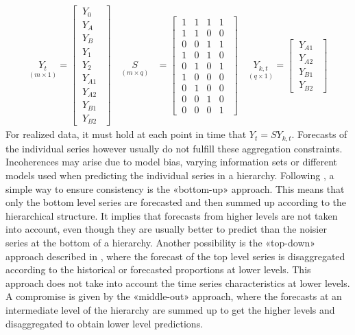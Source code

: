 \documentclass[a4paper,fleqn,11pt]{article}
\begin{document}
\begin{align*}
\underset{(m\times 1)}{Y_t} = \begin{bmatrix}
\ Y_0\ \ \\
\ Y_A\ \ \\
\ Y_B\ \ \\
\ Y_1\ \ \\
\ Y_2\ \ \\
\ Y_{A1}\ \ \\
\ Y_{A2}\ \ \\
\ Y_{B1}\ \ \\
\ Y_{B2}\ \ 
\end{bmatrix} \quad \underset{(m\times q)}{S} &=
\begin{bmatrix}
\ 1 & 1 & 1 & 1 \ \ \\
\ 1 & 1 & 0 & 0 \ \ \\
\ 0 & 0  & 1 & 1\ \ \\
\ 1 & 0 & 1 & 0 \ \ \\
\ 0 & 1 & 0 & 1\ \ \\
\ 1 & 0 & 0 & 0 \ \ \\
\ 0 & 1 & 0 & 0 \ \ \\
\ 0 & 0 & 1 & 0 \ \ \\
\ 0 & 0 & 0 & 1\ \ 
\end{bmatrix} \quad \underset{(q\times 1)}{Y_{k,t}} = \begin{bmatrix}
	\ Y_{A1}\ \ \\
	\ Y_{A2}\ \ \\
	\ Y_{B1}\ \ \\
	\ Y_{B2}\ \ 
\end{bmatrix} 
\end{align*}
For realized data, it must hold at each point in time that $Y_t = S Y_{k,t}$. Forecasts of the individual series however usually do not fulfill these aggregation constraints. Incoherences may arise due to model bias, varying information sets or different models used when predicting the individual series in a hierarchy. Following \cite{Gross1990}, a simple way to ensure consistency is the «bottom-up» approach. This means that only the bottom level series are forecasted and then summed up according to the hierarchical structure. It implies that forecasts from higher levels are not taken into account, even though they are usually better to predict than the noisier series at the bottom of a hierarchy. Another possibility is the «top-down» approach described in \cite{Athanasopoulos2009}, where the forecast of the top level series is disaggregated according to the historical or forecasted proportions at lower levels. This approach does not take into account the time series characteristics at lower levels. A compromise is given by the «middle-out» approach, where the forecasts at an intermediate level of the hierarchy are summed up to get the higher levels and disaggregated to obtain lower level predictions.
\end{document}
